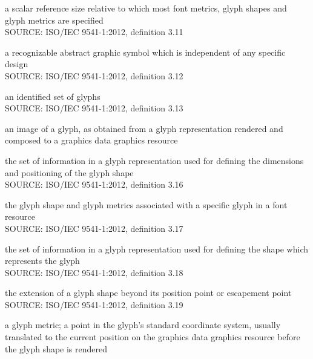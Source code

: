 a scalar reference size relative to which most font metrics, glyph shapes and glyph metrics are specified \\
\lbrack SOURCE: ISO/IEC 9541-1:2012, definition 3.11 \rbrack

a recognizable abstract graphic symbol which is independent of any specific design \\
\lbrack SOURCE: ISO/IEC 9541-1:2012, definition 3.12 \rbrack

an identified set of glyphs \\
\lbrack SOURCE: ISO/IEC 9541-1:2012, definition 3.13 \rbrack

an image of a glyph, as obtained from a glyph representation rendered and composed to a graphics data graphics resource

the set of information in a glyph representation used for defining the dimensions and positioning of the glyph shape \\
\lbrack SOURCE: ISO/IEC 9541-1:2012, definition 3.16 \rbrack

the glyph shape and glyph metrics associated with a specific glyph in a font resource \\
\lbrack SOURCE: ISO/IEC 9541-1:2012, definition 3.17 \rbrack

the set of information in a glyph representation used for defining the shape which represents the glyph \\
\lbrack SOURCE: ISO/IEC 9541-1:2012, definition 3.18 \rbrack

the extension of a glyph shape beyond its position point or escapement point \\
\lbrack SOURCE: ISO/IEC 9541-1:2012, definition 3.19 \rbrack

a glyph metric; a point in the glyph's standard coordinate system, usually translated to the current position on the graphics data graphics resource before the glyph shape is rendered

